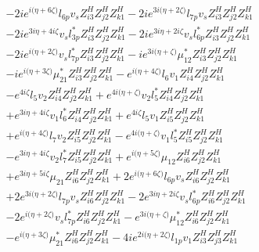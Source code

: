 \begin{align}
 &-2 i e^{i \Big(\eta +6 \zeta \Big)} l_{6p} v_s Z_{{i 3}}^{H} Z_{{j 2}}^{H} Z_{{k 1}}^{H} -2 i e^{3 i \Big(\eta +2 \zeta \Big)} l_{7p} v_s Z_{{i 3}}^{H} Z_{{j 2}}^{H} Z_{{k 1}}^{H} \nonumber \\ 
 &-2 i e^{3 i \eta +4 i \zeta } v_s l_{3p}^* Z_{{i 3}}^{H} Z_{{j 2}}^{H} Z_{{k 1}}^{H} -2 i e^{3 i \eta +2 i \zeta } v_s l_{6p}^* Z_{{i 3}}^{H} Z_{{j 2}}^{H} Z_{{k 1}}^{H} \nonumber \\ 
 &-2 i e^{i \Big(\eta +2 \zeta \Big)} v_s l_{7p}^* Z_{{i 3}}^{H} Z_{{j 2}}^{H} Z_{{k 1}}^{H} -i e^{3 i \Big(\eta +\zeta \Big)} \mu_{12}^* Z_{{i 3}}^{H} Z_{{j 2}}^{H} Z_{{k 1}}^{H} \nonumber \\ 
 &-i e^{i \Big(\eta +3 \zeta \Big)} \mu_{21}^* Z_{{i 3}}^{H} Z_{{j 2}}^{H} Z_{{k 1}}^{H} - e^{i \Big(\eta +4 \zeta \Big)} l_6 v_1 Z_{{i 4}}^{H} Z_{{j 2}}^{H} Z_{{k 1}}^{H} \nonumber \\ 
 &- e^{4 i \zeta } l_5 v_2 Z_{{i 4}}^{H} Z_{{j 2}}^{H} Z_{{k 1}}^{H} +e^{4 i \Big(\eta +\zeta \Big)} v_2 l_5^* Z_{{i 4}}^{H} Z_{{j 2}}^{H} Z_{{k 1}}^{H} \nonumber \\ 
 &+e^{3 i \eta +4 i \zeta } v_1 l_6^* Z_{{i 4}}^{H} Z_{{j 2}}^{H} Z_{{k 1}}^{H} +e^{4 i \zeta } l_5 v_1 Z_{{i 5}}^{H} Z_{{j 2}}^{H} Z_{{k 1}}^{H} \nonumber \\ 
 &+e^{i \Big(\eta +4 \zeta \Big)} l_7 v_2 Z_{{i 5}}^{H} Z_{{j 2}}^{H} Z_{{k 1}}^{H} - e^{4 i \Big(\eta +\zeta \Big)} v_1 l_5^* Z_{{i 5}}^{H} Z_{{j 2}}^{H} Z_{{k 1}}^{H} \nonumber \\ 
 &- e^{3 i \eta +4 i \zeta } v_2 l_7^* Z_{{i 5}}^{H} Z_{{j 2}}^{H} Z_{{k 1}}^{H} +e^{i \Big(\eta +5 \zeta \Big)} \mu_{12} Z_{{i 6}}^{H} Z_{{j 2}}^{H} Z_{{k 1}}^{H} \nonumber \\ 
 &+e^{3 i \eta +5 i \zeta } \mu_{21} Z_{{i 6}}^{H} Z_{{j 2}}^{H} Z_{{k 1}}^{H} +2 e^{i \Big(\eta +6 \zeta \Big)} l_{6p} v_s Z_{{i 6}}^{H} Z_{{j 2}}^{H} Z_{{k 1}}^{H} \nonumber \\ 
 &+2 e^{3 i \Big(\eta +2 \zeta \Big)} l_{7p} v_s Z_{{i 6}}^{H} Z_{{j 2}}^{H} Z_{{k 1}}^{H} -2 e^{3 i \eta +2 i \zeta } v_s l_{6p}^* Z_{{i 6}}^{H} Z_{{j 2}}^{H} Z_{{k 1}}^{H} \nonumber \\ 
 &-2 e^{i \Big(\eta +2 \zeta \Big)} v_s l_{7p}^* Z_{{i 6}}^{H} Z_{{j 2}}^{H} Z_{{k 1}}^{H} - e^{3 i \Big(\eta +\zeta \Big)} \mu_{12}^* Z_{{i 6}}^{H} Z_{{j 2}}^{H} Z_{{k 1}}^{H} \nonumber \\ 
 &- e^{i \Big(\eta +3 \zeta \Big)} \mu_{21}^* Z_{{i 6}}^{H} Z_{{j 2}}^{H} Z_{{k 1}}^{H} -4 i e^{2 i \Big(\eta +2 \zeta \Big)} l_{1p} v_1 Z_{{i 3}}^{H} Z_{{j 3}}^{H} Z_{{k 1}}^{H} \nonumber \\ 

\end{align}
